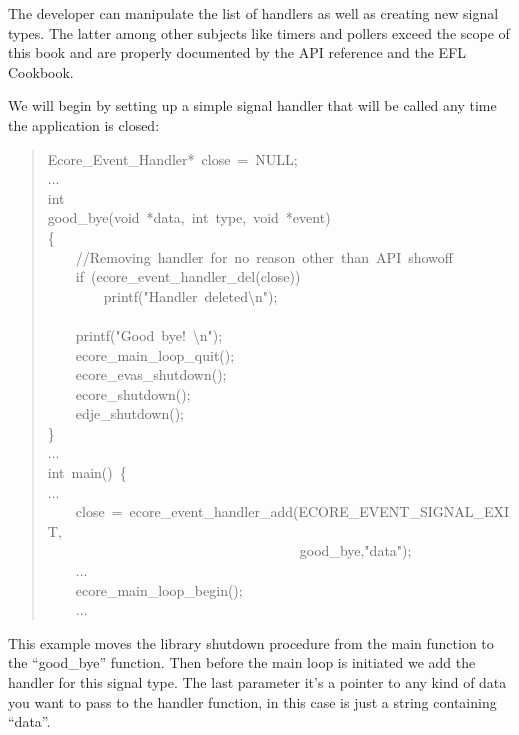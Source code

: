 \documentclass[12pt,a4paper,english]{book}
\begin{document}
The developer can manipulate the list of handlers as well as creating new
signal types. The latter among other subjects like timers and pollers exceed
the scope of this book and are properly documented by the API reference and the
EFL Cookbook.

We will begin by setting up a simple signal handler that will be called any
time the application is closed:
\begin{quote}{\ttfamily \raggedright \noindent
Ecore{\_}Event{\_}Handler*~close~=~NULL;~\\
...~\\
int~\\
good{\_}bye(void~*data,~int~type,~void~*event)~\\
{\{}~\\
~~~~//Removing~handler~for~no~reason~other~than~API~showoff~\\
~~~~if~(ecore{\_}event{\_}handler{\_}del(close))~\\
~~~~~~~~printf("Handler~deleted{\textbackslash}n");~\\
~\\
~~~~printf("Good~bye!~{\textbackslash}n");~\\
~~~~ecore{\_}main{\_}loop{\_}quit();~\\
~~~~ecore{\_}evas{\_}shutdown();~\\
~~~~ecore{\_}shutdown();~\\
~~~~edje{\_}shutdown();~\\
{\}}~\\
...~\\
int~main()~{\{}~\\
...~\\
~~~~close~=~ecore{\_}event{\_}handler{\_}add(ECORE{\_}EVENT{\_}SIGNAL{\_}EXIT,~\\
~~~~~~~~~~~~~~~~~~~~~~~~~~~~~~~~~~~~good{\_}bye,"data");~\\
~~~~...~\\
~~~~ecore{\_}main{\_}loop{\_}begin();~\\
~~~~...
}\end{quote}

This example moves the library shutdown procedure from the main function to the
``good{\_}bye'' function. Then before the main loop is initiated we add the handler
for this signal type. The last parameter it's a pointer to any kind of data you
want to pass to the handler function, in this case is just a string containing
``data''.
\end{document}

